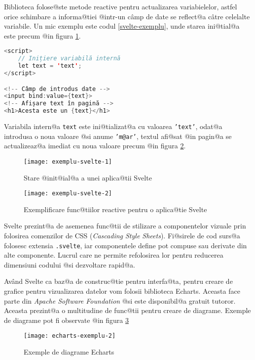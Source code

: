 Biblioteca folose@ste metode reactive pentru actualizarea variabielelor, astfel orice schimbare a informa@tiei @intr-un c\^ amp de date se reflect@a c\^ atre celelalte variabile. Un mic exemplu este codul \ref{svelte-exemplu}, unde starea ini@tial@a este precum @in figura \ref{fig:exemplu-svelte-1}.

\begin{lstlisting}[language=Java, caption={Exemplu de utilizare a bibliotecii Svelte}, label={svelte-exemplu}]
<script>
	// Inițiere variabilă internă
	let text = 'text'; 
</script>

<!-- Câmp de introdus date -->
<input bind:value={text}>
<!-- Afișare text în pagină -->
<h1>Acesta este un {text}</h1>
\end{lstlisting}

Variabila intern@a \texttt{text} este ini@tializat@a cu valoarea \texttt{'text'}, odat@a introdusa o noua valoare @si anume \texttt{'m@ar'}, textul afi@sat @in pagin@a se actualizeaz@a imediat cu noua valoare precum @in figura \ref{fig:exemplu-svelte-2}. 

\begin{figure}[h]
	\centering
	\texttt{[image: exemplu-svelte-1]}
	\caption{Stare @init@ial@a a unei aplica@tii Svelte}
	\label{fig:exemplu-svelte-1}
\end{figure}

\begin{figure}[h]
	\centering
	\texttt{[image: exemplu-svelte-2]}
	\caption{Exemplificare func@tiilor reactive pentru o aplica@tie Svelte}
	\label{fig:exemplu-svelte-2}
\end{figure}

Svelte prezint@a de asemenea func@tii de stilizare a componentelor vizuale prin folosirea comenzilor de CSS (\textsl{Cascading Style Sheets}). Fi@sirele de cod surs@a folosesc extensia \texttt{.svelte}, iar componentele define pot compuse sau derivate din alte componente. Lucrul care ne permite refolosirea lor pentru reducerea dimensiuni codului @si dezvoltare rapid@a.

Av\^ and Svelte ca baz@a de construc@tie pentru interfa@ta, pentru creare de grafice pentru vizualizarea datelor vom folosii biblioteca Echarts. Aceasta face parte din \textsl{Apache Software Foundation} @si este disponibil@a gratuit tutoror. Aceasta prezint@a o multitudine de func@tii pentru creare de diagrame. Exemple de diagrame pot fi observate @in figura \ref{fig:echarts-exemplu-2} 

\begin{figure}[h]
	\centering
	\texttt{[image: echarts-exemplu-2]}
	\caption{Exemple de diagrame Echarts \cite{diagrame-exemplu}}
	\label{fig:echarts-exemplu-2}
\end{figure}

